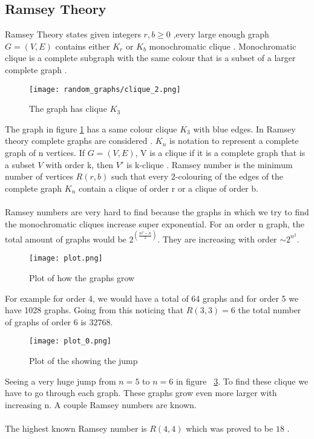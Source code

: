\documentclass{Assignment}
\begin{document}
\subsection{Ramsey Theory}
Ramsey Theory states given integers $ r,b\geq 0$ ,every large enough graph $G = (V,E)$ contains either  $K_r $ or ${K_b}$ monochromatic clique \cite{katz2018introduction}.
Monochromatic clique is a complete subgraph with the same colour that is a subset of a larger complete graph \cite{BondyMurty2008}.
\begin{figure}[H]
	\centering
	\texttt{[image: random\_graphs/clique\_2.png]}
	\caption{The graph has clique $K_3$}
	\label{clique}
\end{figure}
The graph in figure \ref{clique} has a same colour clique $K_3$ with blue edges.
In Ramsey theory complete graphs are considered \cite{burr1981generalized}.
$K_n$ is notation to represent a complete graph of n vertices.
If $G = (V, E)$, V is a clique if it is a complete graph that is a subset $V$ with order k, then $V'$ is k-clique \cite{katz2018introduction}. 
Ramsey number is the minimum number of vertices $R(r,b)$ such that every 2-colouring of the edges of the complete graph $K_n$ contain a clique of order r or a clique of order b.
\\\\
Ramsey numbers are very hard to find because the graphs in which we try to find the monochromatic cliques increase super exponential.
For an order n graph, the total amount of graphs would be $2^{\left(\frac{n^2-n}{2}\right)}$.
They are increasing with order $\sim 2^{n^2}$.
\begin{figure}[H]
	\centering
	\texttt{[image: plot.png]}
	\caption{Plot of how the graphs grow}
	\label{plot}
\end{figure}
For example for order 4, we would have a total of 64 graphs and for order 5 we have 1028 graphs.
Going from this noticing that $R(3,3) = 6$ the total number of graphs of order 6 is $32768$.
\begin{figure}[H]
	\centering
	\texttt{[image: plot\_0.png]}
	\caption{Plot of the showing the jump}
	\label{plot_0}
\end{figure}
Seeing a very huge jump from $n = 5$ to $n = 6$ in figure ~\ref{plot_0}.
To find these clique we have to go through each graph.
These graphs grow even more larger with increasing n.
A couple Ramsey numbers are known.
\\\\
The highest known Ramsey number is $R(4,4)$ which was proved to be $18$ \cite{GreenwoodGleason1955}.
\end{document}
